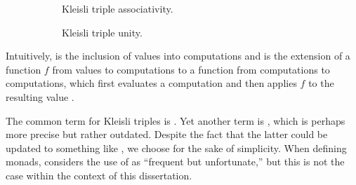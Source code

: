 \begin{definition}
\begin{figure}[htb]
\begin{subfigure}[b]{0.5\linewidth}
\begin{center}
      \end{center}
      \caption{Kleisli triple associativity.}
      \label{fig:triple-associativity}
    \end{subfigure}
    \begin{subfigure}[b]{0.5\linewidth}
      \begin{center}
      \end{center}
      \caption{Kleisli triple unity.}
      \label{fig:triple-unity}
    \end{subfigure}
    \caption{}
  \end{figure}
\end{definition}

\begin{remark}
  \label{re:triple}

  Intuitively,  is the inclusion of values into
  computations and  is the extension of a function $f$ from
  values to computations to a function from computations to
  computations, which first evaluates a computation and then applies
  $f$ to the resulting value \parencite[59]{moggi-1991}.
\end{remark}

\begin{terminology}
  \label{ter:triple}
  The common term for Kleisli triples is . Yet
  another term is 
  \parencite[32]{manes-1976}, which is perhaps more precise but rather
  outdated. Despite the fact that the latter could be updated to
  something like , we choose
   for the sake of simplicity. When defining
  monads, \textcite[138]{maclane-1998} considers the use of
   as ``frequent but unfortunate,'' but this is not the
  case within the context of this dissertation. 
\end{terminology}

